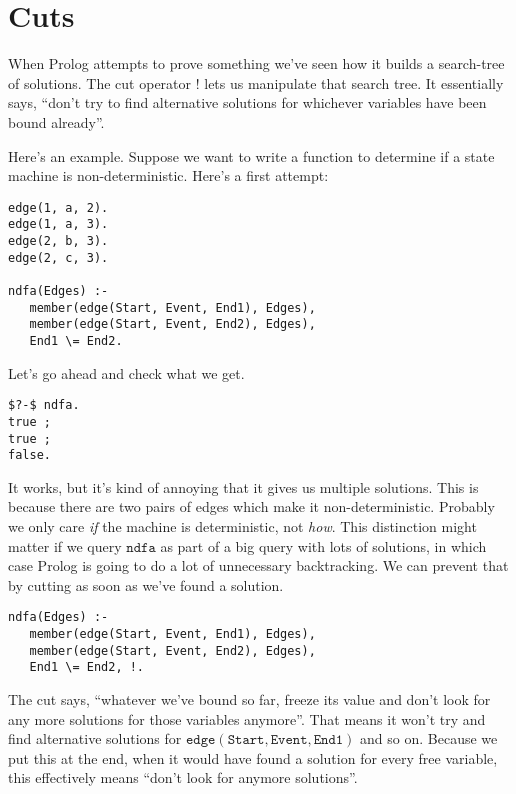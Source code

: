\documentclass[a4paper,12pt]{article}
\newcommand{\kwa}[1]{\mathtt{#1}}
\begin{document}
\section{Cuts}

\noindent
When Prolog attempts to prove something we've seen how it builds a search-tree of solutions. The cut operator $!$ lets us manipulate that search tree. It essentially says, ``don't try to find alternative solutions for whichever variables have been bound already''.

\noindent
Here's an example. Suppose we want to write a function to determine if a state machine is non-deterministic. Here's a first attempt:

\begin{lstlisting}
edge(1, a, 2).
edge(1, a, 3).
edge(2, b, 3).
edge(2, c, 3).

ndfa(Edges) :-
   member(edge(Start, Event, End1), Edges),
   member(edge(Start, Event, End2), Edges),
   End1 \= End2.

\end{lstlisting}

\noindent
Let's go ahead and check what we get.

\begin{lstlisting}
$?-$ ndfa.
true ;
true ;
false.
\end{lstlisting}

\noindent
It works, but it's kind of annoying that it gives us multiple solutions. This is because there are two pairs of edges which make it non-deterministic. Probably we only care \textit{if} the machine is deterministic, not \textit{how}. This distinction might matter if we query $\kwa{ndfa}$ as part of a big query with lots of solutions, in which case Prolog is going to do a lot of unnecessary backtracking. We can prevent that by cutting as soon as we've found a solution.

\begin{lstlisting}
ndfa(Edges) :-
   member(edge(Start, Event, End1), Edges),
   member(edge(Start, Event, End2), Edges),
   End1 \= End2, !.
\end{lstlisting}

\noindent
The cut says, ``whatever we've bound so far, freeze its value and don't look for any more solutions for those variables anymore''. That means it won't try and find alternative solutions for $\kwa{edge(Start, Event, End1)}$ and so on. Because we put this at the end, when it would have found a solution for every free variable, this effectively means ``don't look for anymore solutions''.
\end{document}
